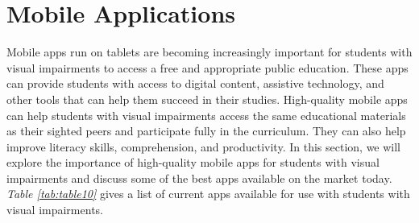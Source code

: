 \pagebreak
\hypertarget{tablet-apps}{}\section{Mobile Applications}\label{tab:tablelet-apps}
Mobile apps run on tablets are becoming increasingly important for students with visual impairments to access a free and appropriate public education. These apps can provide students with access to digital content, assistive technology, and other tools that can help them succeed in their studies. High-quality mobile apps can help students with visual impairments access the same educational materials as their sighted peers and participate fully in the curriculum. They can also help improve literacy skills, comprehension, and productivity. In this section, we will explore the importance of high-quality mobile apps for students with visual impairments and discuss some of the best apps available on the market today. \textit{Table \ref{tab:table10}} gives a list of current apps available for use with students with visual impairments.

\pagebreak 
 
